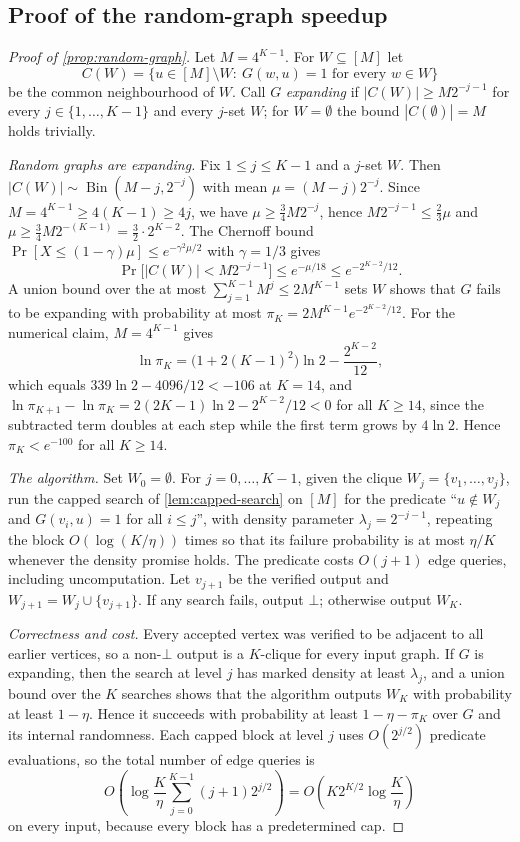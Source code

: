 \subsection{Proof of the random-graph speedup}
\label{app:random-graph}

\begin{proof}[Proof of \cref{prop:random-graph}]
Let $M=4^{K-1}$.  For $W\subseteq[M]$ let
\[
 C(W)=\{u\in[M]\setminus W:\ G(w,u)=1\text{ for every }w\in W\}
\]
be the common neighbourhood of $W$.  Call $G$ \emph{expanding} if
$|C(W)|\ge M2^{-j-1}$ for every $j\in\{1,\ldots,K-1\}$ and every $j$-set
$W$; for $W=\emptyset$ the bound $|C(\emptyset)|=M$ holds trivially.

\emph{Random graphs are expanding.}  Fix $1\le j\le K-1$ and a $j$-set
$W$.  Then $|C(W)|\sim\operatorname{Bin}(M-j,2^{-j})$ with mean
$\mu=(M-j)2^{-j}$.  Since $M=4^{K-1}\ge4(K-1)\ge4j$, we have
$\mu\ge\frac34M2^{-j}$, hence $M2^{-j-1}\le\frac23\mu$ and
$\mu\ge\frac34M2^{-(K-1)}=\frac32\cdot2^{K-2}$.  The Chernoff bound
$\Pr[X\le(1-\gamma)\mu]\le e^{-\gamma^2\mu/2}$ \cite{Chernoff1952} with
$\gamma=1/3$ gives
\[
 \Pr\bigl[|C(W)|<M2^{-j-1}\bigr]\le e^{-\mu/18}\le e^{-2^{K-2}/12}.
\]
A union bound over the at most $\sum_{j=1}^{K-1}M^j\le2M^{K-1}$ sets $W$
shows that $G$ fails to be expanding with probability at most
$\pi_K=2M^{K-1}e^{-2^{K-2}/12}$.  For the numerical claim, $M=4^{K-1}$
gives
\[
 \ln\pi_K=\bigl(1+2(K-1)^2\bigr)\ln2-\frac{2^{K-2}}{12},
\]
which equals $339\ln2-4096/12<-106$ at $K=14$, and
$\ln\pi_{K+1}-\ln\pi_K=2(2K-1)\ln2-2^{K-2}/12<0$ for all $K\ge14$, since
the subtracted term doubles at each step while the first term grows by
$4\ln2$.  Hence $\pi_K<e^{-100}$ for all $K\ge14$.

\emph{The algorithm.}  Set $W_0=\emptyset$.  For $j=0,\ldots,K-1$, given
the clique $W_j=\{v_1,\ldots,v_j\}$, run the capped search of
\cref{lem:capped-search} on $[M]$ for the predicate ``$u\notin W_j$ and
$G(v_i,u)=1$ for all $i\le j$'', with density parameter
$\lambda_j=2^{-j-1}$, repeating the block $O(\log(K/\eta))$ times so that
its failure probability is at most $\eta/K$ whenever the density promise
holds.  The predicate costs $O(j+1)$ edge queries, including uncomputation.
Let $v_{j+1}$ be the verified output and $W_{j+1}=W_j\cup\{v_{j+1}\}$.  If
any search fails, output $\bot$; otherwise output $W_K$.

\emph{Correctness and cost.}  Every accepted vertex was verified to be
adjacent to all earlier vertices, so a non-$\bot$ output is a $K$-clique
for every input graph.  If $G$ is expanding, then the search at level $j$
has marked density at least $\lambda_j$, and a union bound over the $K$
searches shows that the algorithm outputs $W_K$ with probability at least
$1-\eta$.  Hence it succeeds with probability at least $1-\eta-\pi_K$ over
$G$ and its internal randomness.  Each capped block at level $j$ uses
$O(2^{j/2})$ predicate evaluations, so the total number of edge queries is
\[
 O\!\left(\log\frac K\eta\sum_{j=0}^{K-1}(j+1)2^{j/2}\right)
 =O\!\left(K2^{K/2}\log\frac K\eta\right)
\]
on every input, because every block has a predetermined cap.
\end{proof}

